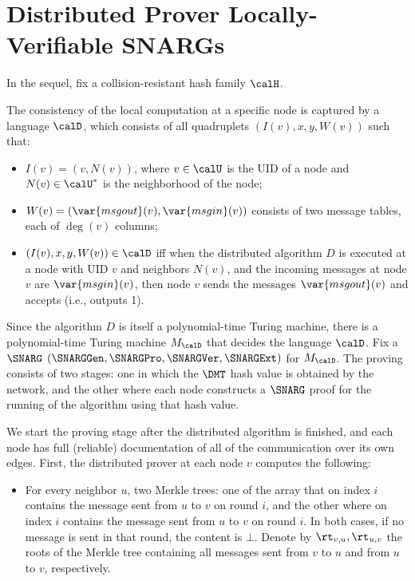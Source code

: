 \section{Distributed Prover Locally-Verifiable SNARGs}


In the sequel, fix a collision-resistant hash family $\calH$.

The consistency of the local computation at a specific node is captured
by a
language $\calD$,
which consists of all quadruplets $(I(v), x, y, W(v))$ such that:
\begin{itemize}
    \item $I(v) = (v, N(v))$, where $v \in \calU$ is the UID of a node and 		$N(v) \in \calU^{\ast}$ is the neighborhood of the node;
    \item $W(v) = (\var{msgout}(v), \var{msgin}(v))$ consists of two message tables, each of $\deg(v)$ columns;
    \item $(I(v), x, y, W(v)) \in \calD$ iff when the distributed algorithm $D$ is executed at a node with UID $v$ and neighbors $N(v)$, and the incoming messages at node $v$ are $\var{msgin}(v)$, then node $v$ sends the messages $\var{msgout}(v)$ and accepts (i.e., outputs 1).
\end{itemize}

Since the algorithm $D$ is itself a polynomial-time Turing machine, there is a polynomial-time Turing machine $M_\calD$ that decides the language $\calD$.
Fix a $\SNARG$  $(\SNARGGen, \SNARGPro, \SNARGVer, \SNARGExt)$ for $M_\calD$. The proving consists of two stages: one in which the $\DMT$ hash value is obtained by the network, and the other where each node constructs a $\SNARG$ proof for the running of the algorithm using that hash value.

We start the proving stage after the distributed algorithm is finished, and each node has full (reliable) documentation of all of the communication over its own edges. First, the distributed prover at each node $v$ computes the following:
\begin{itemize}
    \item For every neighbor $u$, two Merkle trees: one of the array that on index $i$ contains the message sent from $u$ to $v$ on round $i$, and the other where on index $i$ contains the message sent from $u$ to $v$ on round $i$. In both cases, if no message is sent in that round, the content is $\bot$. Denote by $\rt_{v,u}, \rt_{u,v}$ the roots of the Merkle tree containing all messages sent from $v$ to $u$ and from $u$ to $v$, respectively.
\end{itemize}

